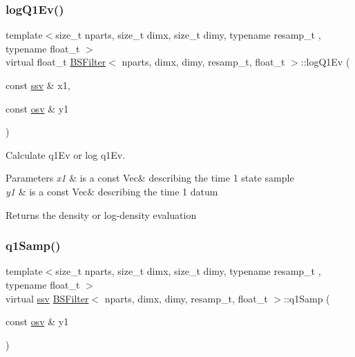 \subsubsection{\texorpdfstring{log\+Q1\+Ev()}{logQ1Ev()}}
{\footnotesize\ttfamily template$<$size\+\_\+t nparts, size\+\_\+t dimx, size\+\_\+t dimy, typename resamp\+\_\+t , typename float\+\_\+t $>$ \\
virtual float\+\_\+t \hyperlink{classBSFilter}{B\+S\+Filter}$<$ nparts, dimx, dimy, resamp\+\_\+t, float\+\_\+t $>$\+::log\+Q1\+Ev (\begin{DoxyParamCaption}\item[{const \hyperlink{classBSFilter_a0b5bc93957fb6b6b1282f31fa2e01c3c}{ssv} \&}]{x1,  }\item[{const \hyperlink{classBSFilter_ad8512328484d7c7bd7a3b7a9481d7f37}{osv} \&}]{y1 }\end{DoxyParamCaption})\hspace{0.3cm}{\ttfamily [pure virtual]}}



Calculate q1\+Ev or log q1\+Ev. 


\begin{DoxyParams}{Parameters}
{\em x1} & is a const Vec\& describing the time 1 state sample \\
\hline
{\em y1} & is a const Vec\& describing the time 1 datum \\
\hline
\end{DoxyParams}
\begin{DoxyReturn}{Returns}
the density or log-\/density evaluation 
\end{DoxyReturn}
\mbox{\label{classBSFilter_a457b10ec9f21aed47c2754b362a6859d}} 
\subsubsection{\texorpdfstring{q1\+Samp()}{q1Samp()}}
{\footnotesize\ttfamily template$<$size\+\_\+t nparts, size\+\_\+t dimx, size\+\_\+t dimy, typename resamp\+\_\+t , typename float\+\_\+t $>$ \\
virtual \hyperlink{classBSFilter_a0b5bc93957fb6b6b1282f31fa2e01c3c}{ssv} \hyperlink{classBSFilter}{B\+S\+Filter}$<$ nparts, dimx, dimy, resamp\+\_\+t, float\+\_\+t $>$\+::q1\+Samp (\begin{DoxyParamCaption}\item[{const \hyperlink{classBSFilter_ad8512328484d7c7bd7a3b7a9481d7f37}{osv} \&}]{y1 }\end{DoxyParamCaption})\hspace{0.3cm}{\ttfamily [pure virtual]}}




